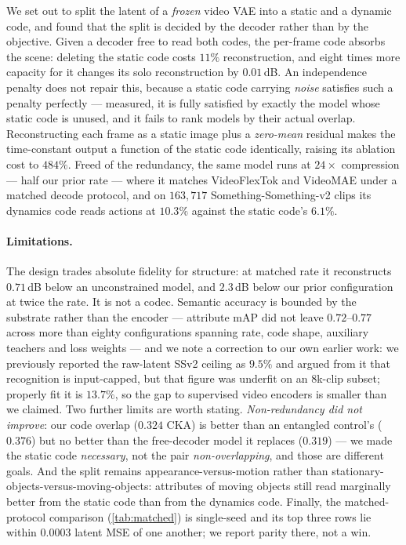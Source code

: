 We set out to split the latent of a \emph{frozen} video VAE into a static and a dynamic
code, and found that the split is decided by the decoder rather than by the objective.
Given a decoder free to read both codes, the per-frame code absorbs the scene: deleting
the static code costs $11\%$ reconstruction, and eight times more capacity for it changes
its solo reconstruction by $0.01$\,dB. An independence penalty does not repair this,
because a static code carrying \emph{noise} satisfies such a penalty perfectly ---
measured, it is fully satisfied by exactly the model whose static code is unused, and it
fails to rank models by their actual overlap. Reconstructing each frame as a static image
plus a \emph{zero-mean} residual makes the time-constant output a function of the static
code identically, raising its ablation cost to $484\%$. Freed of the redundancy, the same
model runs at $24\times$ compression --- half our prior rate --- where it matches
VideoFlexTok and VideoMAE under a matched decode protocol, and on $163{,}717$
Something-Something-v2 clips its dynamics code reads actions at $10.3\%$ against the
static code's $6.1\%$.

\paragraph{Limitations.}
\label{sec:limitations}
The design trades absolute fidelity for structure: at matched rate it reconstructs
$0.71$\,dB below an unconstrained model, and $2.3$\,dB below our prior configuration at
twice the rate. It is not a codec. Semantic accuracy is bounded by the substrate rather
than the encoder --- attribute mAP did not leave $0.72$--$0.77$ across more than eighty
configurations spanning rate, code shape, auxiliary teachers and loss weights --- and we
note a correction to our own earlier work: we previously reported the raw-latent SSv2
ceiling as $9.5\%$ and argued from it that recognition is input-capped, but that figure
was underfit on an $8$k-clip subset; properly fit it is $13.7\%$, so the gap to
supervised video encoders is smaller than we claimed. Two further limits are worth
stating. \emph{Non-redundancy did not improve}: our code overlap ($0.324$ CKA) is better
than an entangled control's ($0.376$) but no better than the free-decoder model it
replaces ($0.319$) --- we made the static code \emph{necessary}, not the pair
\emph{non-overlapping}, and those are different goals. And the split remains
appearance-versus-motion rather than stationary-objects-versus-moving-objects: attributes
of moving objects still read marginally better from the static code than from the
dynamics code. Finally, the matched-protocol comparison (\cref{tab:matched}) is
single-seed and its top three rows lie within $0.0003$ latent MSE of one another; we
report parity there, not a win.
